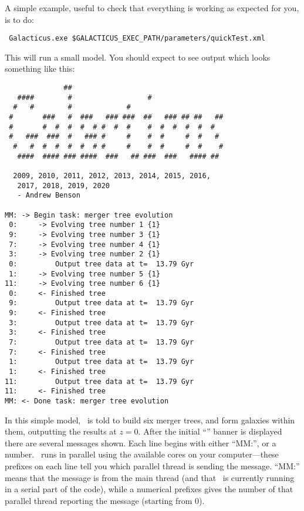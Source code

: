 A simple example, useful to check that everything is working as expected for you, is to do:
\begin{verbatim}
 Galacticus.exe $GALACTICUS_EXEC_PATH/parameters/quickTest.xml
\end{verbatim}
This will run a small model. You should expect to see output which looks something like this:
\begin{verbatim}
              ##                                     
   ####        #                  #                  
  #   #        #             #                       
 #       ###   #  ###   ### ###  ##   ### ## ##   ## 
 #       #  #  #  #  # #  #  #    #  #  #  #  #  #   
 #   ###  ###  #   ### #     #    #  #     #  #   #  
  #   #  #  #  #  #  # #     #    #  #     #  #    # 
   ####  #### ### ####  ###   ## ###  ###   #### ##  

  2009, 2010, 2011, 2012, 2013, 2014, 2015, 2016,
   2017, 2018, 2019, 2020
   - Andrew Benson

MM: -> Begin task: merger tree evolution
 0:     -> Evolving tree number 1 {1}
 9:     -> Evolving tree number 3 {1}
 7:     -> Evolving tree number 4 {1}
 3:     -> Evolving tree number 2 {1}
 0:         Output tree data at t=  13.79 Gyr
 1:     -> Evolving tree number 5 {1}
11:     -> Evolving tree number 6 {1}
 0:     <- Finished tree
 9:         Output tree data at t=  13.79 Gyr
 9:     <- Finished tree
 3:         Output tree data at t=  13.79 Gyr
 3:     <- Finished tree
 7:         Output tree data at t=  13.79 Gyr
 7:     <- Finished tree
 1:         Output tree data at t=  13.79 Gyr
 1:     <- Finished tree
11:         Output tree data at t=  13.79 Gyr
11:     <- Finished tree
MM: <- Done task: merger tree evolution
\end{verbatim}
In this simple model, \glc\ is told to build six merger trees, and form galaxies within them, outputting the results at $z=0$. After the initial ``\glc'' banner is displayed there are several messages shown. Each line begins with either ``{\normalfont \ttfamily MM:}'', or a number. \glc\ runs in parallel using the available cores on your computer---these prefixes on each line tell you which parallel thread is sending the message. ``{\normalfont \ttfamily MM:}'' means that the message is from the main thread (and that \glc\ is currently running in a serial part of the code), while a numerical prefixes gives the number of that parallel thread reporting the message (starting from 0).

